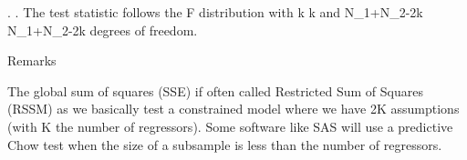 {.} {.}
The test statistic follows the F distribution with {\displaystyle k} k and {\displaystyle N_{1}+N_{2}-2k} N_{1}+N_{2}-2k degrees of freedom.

Remarks

The global sum of squares (SSE) if often called Restricted Sum of Squares (RSSM) as we basically test a constrained model where we have 2K assumptions (with K the number of regressors).
Some software like SAS will use a predictive Chow test when the size of a subsample is less than the number of regressors.



